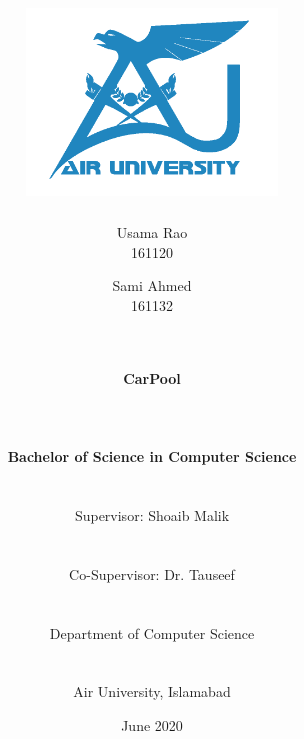 \documentclass[12pt,a4paper]{report}
\begin{document}

\title{\includegraphics[width=0.5\textwidth]{AU-Logo.png}\\}

\author{
	Usama Rao \\ 161120 \and
	
	Sami Ahmed \\ 161132  \and
	
	\\\\
	
	\textbf{\Large CarPool}
	
	\\\\\\
	
	\textbf{\large Bachelor of Science in Computer Science}
	
	\\\\
	
	{\normalsize Supervisor: Shoaib Malik}
	
	\\\\
	
	{\normalsize Co-Supervisor: Dr. Tauseef}
	
	\\\\
	
	{\normalsize Department of Computer Science}
	
	\\\\
	
	{\normalsize Air University, Islamabad}
	
	\date{\normalsize June 2020}
}

\maketitle

\thispagestyle{empty}

\cleardoublepage
\end{document}
